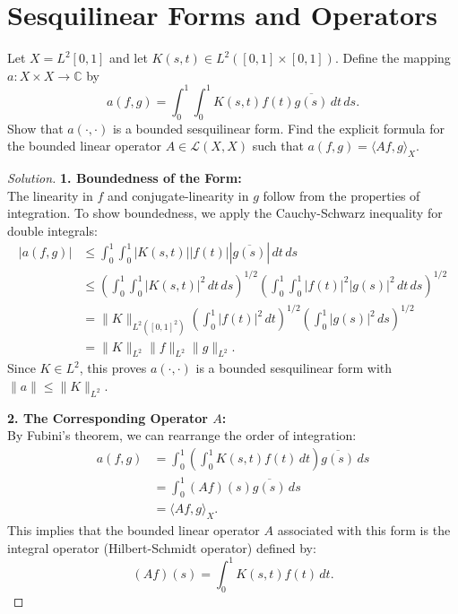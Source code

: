 \documentclass{article}
\begin{document}
\section{Sesquilinear Forms and Operators}

\begin{problem}
    Let $X = L^2[0, 1]$ and let $K(s, t) \in L^2([0,1] \times [0,1])$. Define the mapping $a: X \times X \to \mathbb{C}$ by
    \[ a(f, g) = \int_0^1 \int_0^1 K(s, t) f(t) \overline{g(s)} \, dt \, ds. \]
    Show that $a(\cdot, \cdot)$ is a bounded sesquilinear form. Find the explicit formula for the bounded linear operator $A \in \mathcal{L}(X, X)$ such that $a(f, g) = \langle Af, g \rangle_X$.
\end{problem}

\begin{proof}[Solution]
    \textbf{1. Boundedness of the Form:} \\
    The linearity in $f$ and conjugate-linearity in $g$ follow from the properties of integration. To show boundedness, we apply the Cauchy-Schwarz inequality for double integrals:
    \begin{align*}
        |a(f, g)| &\leq \int_0^1 \int_0^1 |K(s, t)| |f(t)| |\overline{g(s)}| \, dt \, ds \\
        &\leq \left( \int_0^1 \int_0^1 |K(s, t)|^2 \, dt \, ds \right)^{1/2} \left( \int_0^1 \int_0^1 |f(t)|^2 |g(s)|^2 \, dt \, ds \right)^{1/2} \\
        &= \|K\|_{L^2([0,1]^2)} \left( \int_0^1 |f(t)|^2 \, dt \right)^{1/2} \left( \int_0^1 |g(s)|^2 \, ds \right)^{1/2} \\
        &= \|K\|_{L^2} \|f\|_{L^2} \|g\|_{L^2}.
    \end{align*}
    Since $K \in L^2$, this proves $a(\cdot, \cdot)$ is a bounded sesquilinear form with $\|a\| \leq \|K\|_{L^2}$.
    
    \textbf{2. The Corresponding Operator $A$:} \\
    By Fubini's theorem, we can rearrange the order of integration:
    \begin{align*}
        a(f, g) &= \int_0^1 \left( \int_0^1 K(s, t) f(t) \, dt \right) \overline{g(s)} \, ds \\
        &= \int_0^1 (Af)(s) \overline{g(s)} \, ds \\
        &= \langle Af, g \rangle_X.
    \end{align*}
    This implies that the bounded linear operator $A$ associated with this form is the integral operator (Hilbert-Schmidt operator) defined by:
    \[ (Af)(s) = \int_0^1 K(s, t) f(t) \, dt. \]
\end{proof}
\end{document}
